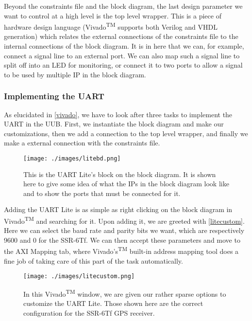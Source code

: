 Beyond the constraints file and the block diagram, the last design parameter we want to control at a high level is the top level wrapper. This is a piece of hardware design language (Vivado\textsuperscript{TM} supports both Verilog and VHDL generation) which relates the external connections of the constraints file to the internal connections of the block diagram. It is in here that we can, for example, connect a signal line to an external port. We can also map such a signal line to split off into an LED for monitoring, or connect it to two ports to allow a signal to be used by multiple IP in the block diagram.  
\subsubsection{Implementing the UART}
As elucidated in \autoref{vivado}, we have to look after three tasks to implement the UART in the UUB. First, we instantiate the block diagram and make our customizations, then we add a connection to the top level wrapper, and finally we make a external connection with the constraints file.
\begin{figure}[h!]
\centering
\texttt{[image: ./images/litebd.png]}
\caption[UART Lite Block Diagram Representation]{This is the UART Lite's block on the block diagram. It is shown here to give some idea of what the IPs in the block diagram look like and to show the ports that must be connected for it.}
\label{litebd}
\end{figure}
Adding the UART Lite is as simple as right clicking on the block diagram in Vivado\textsuperscript{TM} and searching for it. Upon adding it, we are greeted with \autoref{litecustom}. Here we can select the baud rate and parity bits we want, which are respectively 9600 and 0 for the SSR-6Tf. We can then accept these parameters and move to the AXI Mapping tab, where Vivado's\textsuperscript{TM} built-in address mapping tool does a fine job of taking care of this part of the task automatically. 
\begin{figure}[h!]
\centering
\texttt{[image: ./images/litecustom.png]}
\caption[UART Lite Customization Parameters]{In this Vivado\textsuperscript{TM} window, we are given our rather sparse options to customize the UART Lite. Those shown here are the correct configuration for the SSR-6Tf GPS receiver.}
\label{litecustom}
\end{figure}
